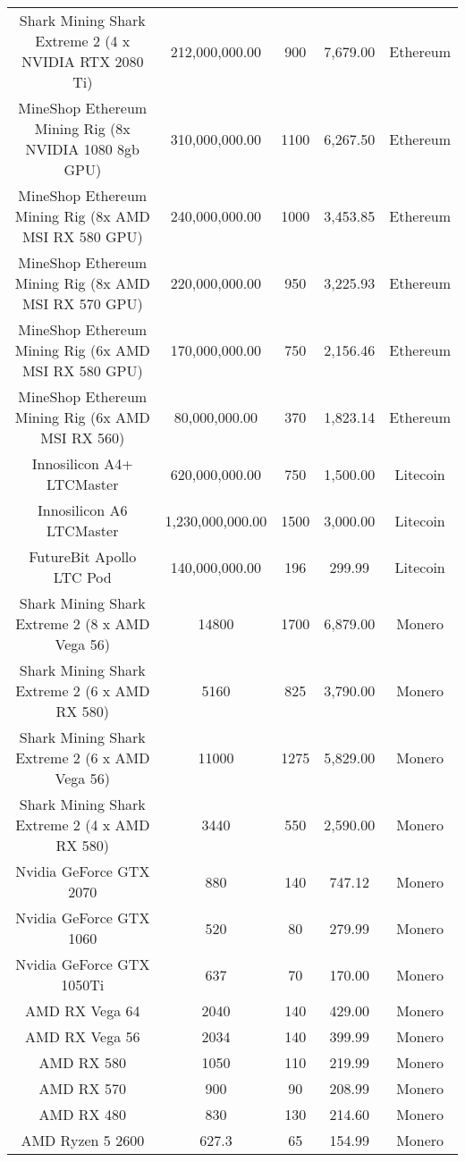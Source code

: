 \begin{table}[!ht]
{\begin{tabular}{|c|c|c|c|c|}
        Shark Mining Shark Extreme 2 (4 x NVIDIA RTX 2080 Ti) & 212,000,000.00 & 900 & 7,679.00 & Ethereum \\
        MineShop Ethereum Mining Rig (8x NVIDIA 1080 8gb GPU) & 310,000,000.00 & 1100 & 6,267.50 & Ethereum \\
        MineShop Ethereum Mining Rig (8x AMD MSI RX 580 GPU) & 240,000,000.00 & 1000 & 3,453.85 & Ethereum \\
        MineShop Ethereum Mining Rig (8x AMD MSI RX 570 GPU) & 220,000,000.00 & 950 & 3,225.93 & Ethereum \\
        MineShop Ethereum Mining Rig (6x AMD MSI RX 580 GPU) & 170,000,000.00 & 750 & 2,156.46 & Ethereum \\
        MineShop Ethereum Mining Rig (6x AMD MSI RX 560) & 80,000,000.00 & 370 & 1,823.14 & Ethereum \\
        Innosilicon A4+ LTCMaster & 620,000,000.00 & 750 & 1,500.00 & Litecoin \\
        Innosilicon A6 LTCMaster & 1,230,000,000.00 & 1500 & 3,000.00 & Litecoin \\
        FutureBit Apollo LTC Pod & 140,000,000.00 & 196 & 299.99 & Litecoin \\
        Shark Mining Shark Extreme 2 (8 x AMD Vega 56) & 14800 & 1700 & 6,879.00 & Monero \\
        Shark Mining Shark Extreme 2 (6 x AMD RX 580) & 5160 & 825 & 3,790.00 & Monero \\
        Shark Mining Shark Extreme 2 (6 x AMD Vega 56) & 11000 & 1275 & 5,829.00 & Monero \\
        Shark Mining Shark Extreme 2 (4 x AMD RX 580) & 3440 & 550 & 2,590.00 & Monero \\
        Nvidia GeForce GTX 2070 & 880 & 140 & 747.12 & Monero \\
        Nvidia GeForce GTX 1060 & 520 & 80 & 279.99 & Monero \\
        Nvidia GeForce GTX 1050Ti & 637 & 70 & 170.00 & Monero \\
        AMD RX Vega 64 & 2040 & 140 & 429.00 & Monero \\
        AMD RX Vega 56 & 2034 & 140 & 399.99 & Monero \\
        AMD RX 580 & 1050 & 110 & 219.99 & Monero \\
        AMD RX 570 & 900 & 90 & 208.99 & Monero \\
        AMD RX 480 & 830 & 130 & 214.60 & Monero \\
        AMD Ryzen 5 2600 & 627.3 & 65 & 154.99 & Monero \\

\end{tabular}}
\end{table}
